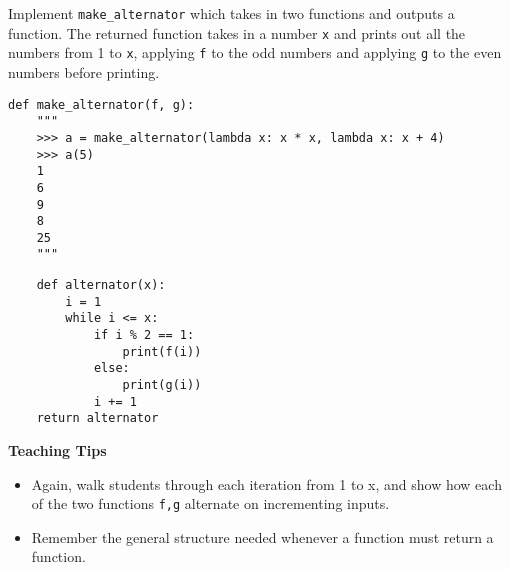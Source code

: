 \begin{blocksection}
\question Implement \lstinline$make_alternator$ which takes in two functions and outputs a function. The returned function takes in a number \texttt{x} and prints out all the numbers from 1 to \texttt{x}, applying \texttt{f} to the odd numbers and applying \texttt{g} to the even numbers before printing.

\begin{lstlisting}
def make_alternator(f, g):
    """
    >>> a = make_alternator(lambda x: x * x, lambda x: x + 4)
    >>> a(5)
    1
    6
    9
    8
    25
    """
\end{lstlisting}

\begin{solution}[1.5in]
\begin{lstlisting}
    def alternator(x):
        i = 1
        while i <= x:
            if i % 2 == 1:
                print(f(i))
            else:
                print(g(i))
            i += 1
    return alternator
\end{lstlisting}
\end{solution}

\begin{blocksection}
 \begin{guide}
   \textbf{Teaching Tips}
   \begin{itemize}
   	   \item Again, walk students through each iteration from 1 to x, and show how each of the two functions \verb|f,g| alternate on incrementing inputs.
   	   \item Remember the general structure needed whenever a function must return a function.
   \end{itemize}
 \end{guide}
\end{blocksection}

\end{blocksection}
